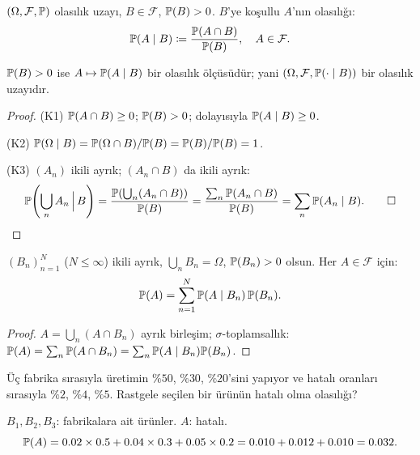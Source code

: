 \begin{tanim}\label{def:kos_olasilik}
$(\Omega,\mathcal{F},\mathbb{P})$ olasılık uzayı, $B \in \mathcal{F}$, $\mathbb{P}(B) > 0$.
$B$'ye koşullu $A$'nın olasılığı:
\[
  \Prob(A \mid B) \coloneqq \frac{\Prob(A \cap B)}{\Prob(B)}, \quad A \in \mathcal{F}.
\]
\end{tanim}

\begin{teorem}\label{thm:kos_olcu}
$\mathbb{P}(B) > 0$ ise $A \mapsto \mathbb{P}(A \mid B)$ bir olasılık ölçüsüdür;
yani $(\Omega, \mathcal{F}, \mathbb{P}(\cdot \mid B))$ bir olasılık uzayıdır.
\end{teorem}

\begin{proof}
(K1) $\mathbb{P}(A \cap B) \geq 0$; $\mathbb{P}(B) > 0$; dolayısıyla $\mathbb{P}(A \mid B) \geq 0$.

(K2) $\mathbb{P}(\Omega \mid B) = \mathbb{P}(\Omega \cap B)/\mathbb{P}(B) = \mathbb{P}(B)/\mathbb{P}(B) = 1$.

(K3) $(A_n)$ ikili ayrık; $(A_n \cap B)$ da ikili ayrık:
\[
  \mathbb{P}\!\left(\bigcup_n A_n \,\Big|\, B\right)
  = \frac{\mathbb{P}\!\left(\bigcup_n (A_n \cap B)\right)}{\mathbb{P}(B)}
  = \frac{\sum_n \mathbb{P}(A_n \cap B)}{\mathbb{P}(B)}
  = \sum_n \mathbb{P}(A_n \mid B).  \qed
\]
\end{proof}

\begin{teorem}\label{thm:toplam_olasilik}
$(B_n)_{n=1}^N$ ($N \leq \infty$) ikili ayrık, $\bigcup_n B_n = \Omega$,
$\mathbb{P}(B_n) > 0$ olsun. Her $A \in \mathcal{F}$ için:
\[
  \mathbb{P}(A) = \sum_{n=1}^N \mathbb{P}(A \mid B_n)\, \mathbb{P}(B_n).
\]
\end{teorem}

\begin{proof}
$A = \bigcup_n (A \cap B_n)$ ayrık birleşim; $\sigma$-toplamsallık:
$\mathbb{P}(A) = \sum_n \mathbb{P}(A \cap B_n) = \sum_n \mathbb{P}(A \mid B_n)\mathbb{P}(B_n)$.
\end{proof}

\begin{ornek}\label{ex:fabrika}
Üç fabrika sırasıyla üretimin $\%50$, $\%30$, $\%20$'sini yapıyor ve
hatalı oranları sırasıyla $\%2$, $\%4$, $\%5$. Rastgele seçilen bir
ürünün hatalı olma olasılığı?

$B_1, B_2, B_3$: fabrikalara ait ürünler. $A$: hatalı.
\[
  \mathbb{P}(A) = 0.02 \times 0.5 + 0.04 \times 0.3 + 0.05 \times 0.2
           = 0.010 + 0.012 + 0.010 = 0.032.
\]
\end{ornek}

